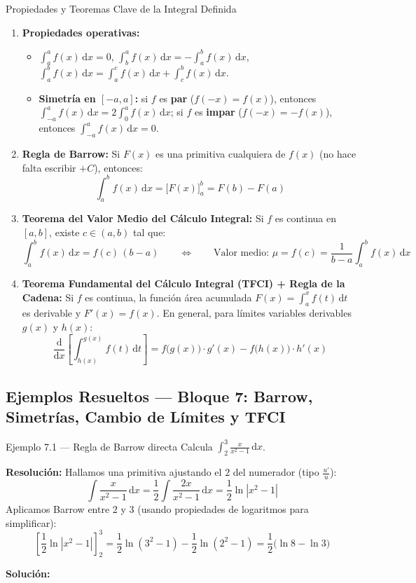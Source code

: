 \documentclass[10pt,a4paper]{article}
\newcommand{\sol}[1]{\par\smallskip\noindent\textbf{Solución:} \fcolorbox{mainblue}{softblue}{$\displaystyle #1$}}
\begin{document}
\begin{formulabox}{Propiedades y Teoremas Clave de la Integral Definida}
\begin{enumerate}\itemsep 2pt
  \item \textbf{Propiedades operativas:}
  \begin{itemize}\itemsep 1pt
    \item $\displaystyle \int_a^a f(x)\,\mathrm{d}x = 0$, \qquad $\displaystyle \int_b^a f(x)\,\mathrm{d}x = -\int_a^b f(x)\,\mathrm{d}x$, \qquad $\displaystyle \int_a^b f(x)\,\mathrm{d}x = \int_a^c f(x)\,\mathrm{d}x + \int_c^b f(x)\,\mathrm{d}x$.
    \item \textbf{Simetría en $[-a, a]$:} si $f$ es \textbf{par} ($f(-x)=f(x)$), entonces $\int_{-a}^a f(x)\,\mathrm{d}x = 2\int_0^a f(x)\,\mathrm{d}x$; si $f$ es \textbf{impar} ($f(-x)=-f(x)$), entonces $\int_{-a}^a f(x)\,\mathrm{d}x = 0$.
  \end{itemize}
  \item \textbf{Regla de Barrow:} Si $F(x)$ es una primitiva cualquiera de $f(x)$ (no hace falta escribir $+C$), entonces:
  $$\int_a^b f(x)\,\mathrm{d}x = \Big[F(x)\Big]_a^b = F(b) - F(a)$$
  \item \textbf{Teorema del Valor Medio del Cálculo Integral:} Si $f$ es continua en $[a,b]$, existe $c \in (a,b)$ tal que:
  $$\int_a^b f(x)\,\mathrm{d}x = f(c)\,(b - a) \qquad \Longleftrightarrow \qquad \text{Valor medio: } \mu = f(c) = \frac{1}{b-a}\int_a^b f(x)\,\mathrm{d}x$$
  \item \textbf{Teorema Fundamental del Cálculo Integral (TFCI) + Regla de la Cadena:} Si $f$ es continua, la función área acumulada $F(x) = \int_a^x f(t)\,\mathrm{d}t$ es derivable y $F'(x) = f(x)$. En general, para límites variables derivables $g(x)$ y $h(x)$:
  $$\frac{\mathrm{d}}{\mathrm{d}x}\left[\int_{h(x)}^{g(x)} f(t)\,\mathrm{d}t\right] = f\big(g(x)\big)\cdot g'(x) - f\big(h(x)\big)\cdot h'(x)$$
\end{enumerate}
\end{formulabox}

\subsection{Ejemplos Resueltos --- Bloque 7: Barrow, Simetrías, Cambio de Límites y TFCI}

\begin{ejemplobox}{Ejemplo 7.1 --- Regla de Barrow directa}
Calcula $\displaystyle \int_2^3 \frac{x}{x^2 - 1}\,\mathrm{d}x$.
\par\textbf{Resolución:} Hallamos una primitiva ajustando el $2$ del numerador (tipo $\frac{u'}{u}$):
$$\int \frac{x}{x^2 - 1}\,\mathrm{d}x = \frac{1}{2}\int \frac{2x}{x^2 - 1}\,\mathrm{d}x = \frac{1}{2}\ln|x^2 - 1|$$
Aplicamos Barrow entre $2$ y $3$ (usando propiedades de logaritmos para simplificar):
$$\left[\frac{1}{2}\ln|x^2 - 1|\right]_2^3 = \frac{1}{2}\ln(3^2 - 1) - \frac{1}{2}\ln(2^2 - 1) = \frac{1}{2}\big(\ln 8 - \ln 3\big)$$
\sol{\frac{1}{2}\ln\!\left(\frac{8}{3}\right)}
\end{ejemplobox}
\end{document}
